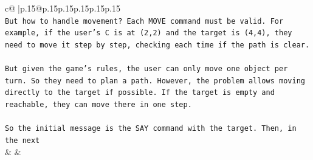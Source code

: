 \documentclass{article}
\begin{document}
{\begin{supertabular}{c@{$\;$}|p{.15\linewidth}@{}p{.15\linewidth}p{.15\linewidth}p{.15\linewidth}p{.15\linewidth}p{.15\linewidth}}
{{{\\ 
\texttt{But how to handle movement? Each MOVE command must be valid. For example, if the user's C is at (2,2) and the target is (4,4), they need to move it step by step, checking each time if the path is clear.} \\
\\ 
\texttt{But given the game's rules, the user can only move one object per turn. So they need to plan a path. However, the problem allows moving directly to the target if possible. If the target is empty and reachable, they can move there in one step.} \\
\\ 
\texttt{So the initial message is the SAY command with the target. Then, in the next} \\
            }
        }
    }
    & & \\ \\


\end{supertabular}}
\end{document}
